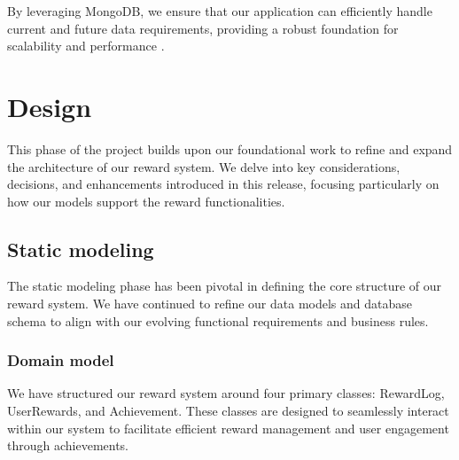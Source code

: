 By leveraging MongoDB, we ensure that our application can efficiently handle current and future data requirements, providing a robust foundation for scalability and performance \cite{MongoDBAppliedDesignPatterns}.

\section{Design}
This phase of the project builds upon our foundational work to refine and expand the architecture of our reward system. We delve into key considerations, decisions, and enhancements introduced in this release, focusing particularly on how our models support the reward functionalities.


\subsection{Static modeling}
The static modeling phase has been pivotal in defining the core structure of our reward system. We have continued to refine our data models and database schema to align with our evolving functional requirements and business rules.


\subsubsection*{Domain model}
We have structured our reward system around four primary classes: RewardLog, UserRewards, and Achievement. These classes are designed to seamlessly interact within our system to facilitate efficient reward management and user engagement through achievements.
\\

